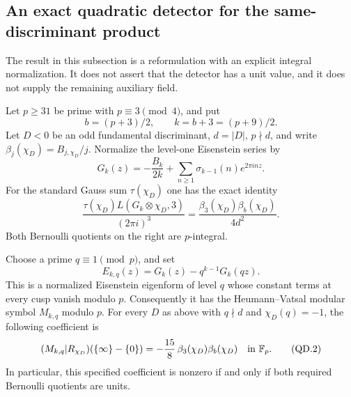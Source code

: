 \subsection{An exact quadratic detector for the same-discriminant product}

The result in this subsection is a reformulation with an explicit integral
normalization.  It does not assert that the detector has a unit value,
and it does not supply the remaining auxiliary field.

\begin{proposition}
Let $p\geq31$ be prime with $p\equiv3\pmod4$, and put
\[
 b=(p+3)/2,\qquad k=b+3=(p+9)/2.
\]
Let $D<0$ be an odd fundamental discriminant, $d=|D|$, $p\nmid d$,
and write $\beta_j(\chi_D)=B_{j,\chi_D}/j$.  Normalize the level-one
Eisenstein series by
\[
 G_k(z)=-\frac{B_k}{2k}+\sum_{n\geq1}\sigma_{k-1}(n)e^{2\pi inz}.
\]
For the standard Gauss sum $\tau(\chi_D)$ one has the exact identity
\begin{equation}
 \frac{\tau(\chi_D)L(G_k\otimes\chi_D,3)}{(2\pi i)^3}
       =\frac{\beta_3(\chi_D)\beta_b(\chi_D)}{4d^2}.
 \tag{QD.1}
\end{equation}
Both Bernoulli quotients on the right are $p$-integral.

Choose a prime $q\equiv1\pmod p$, and set
\[
 E_{k,q}(z)=G_k(z)-q^{k-1}G_k(qz).
\]
This is a normalized Eisenstein eigenform of level $q$ whose constant
terms at every cusp vanish modulo $p$.  Consequently it has the
Heumann--Vatsal modular symbol $M_{k,q}$ modulo $p$.  For every $D$ as
above with $q\nmid d$ and $\chi_D(q)=-1$, the following coefficient is
\begin{equation}
 [X^2Y^{k-4}](M_{k,q}|R_{\chi_D})(\{\infty\}-\{0\})
       =-\frac{15}{8}\,\beta_3(\chi_D)\beta_b(\chi_D)
          \quad\hbox{in }\mathbb F_p.
 \tag{QD.2}
\end{equation}
In particular, this specified coefficient is nonzero if and only if both
required Bernoulli quotients are units.
\end{proposition}

